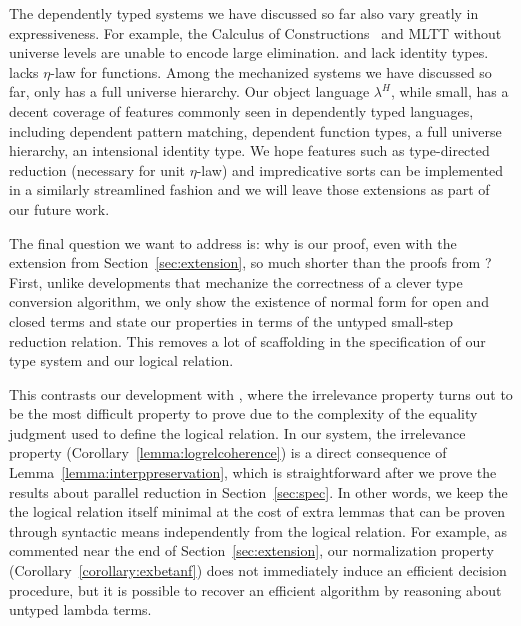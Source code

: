 \documentclass[acmsmall,screen=true,
\ifpublic review=false\else,review=true\fi
  ,anonymous=\ifanonymous true\else false\fi]{acmart}
\newcommand{\lang}{$\lambda^H$\xspace}
\newcommand{\scw}[1]{}
\begin{document}
The dependently typed systems we have discussed so far also vary
greatly in expressiveness. For example, the Calculus of
Constructions~\citep{CoC} and MLTT without universe levels are unable
to encode large elimination. \citet{decagda} and \citet{nbeincoq} lack
identity types. \citet{nbeincoq} lacks $\eta$-law for functions. Among
the mechanized systems we have discussed so far, only
\citet{anand2014towards} has a full universe hierarchy.
Our object language \lang{}, while small, has a decent coverage of
features commonly seen in dependently typed languages, including
dependent pattern matching, dependent function types, a full universe
hierarchy, an intensional identity type. We hope features such as
type-directed reduction (necessary for unit $\eta$-law) and
impredicative sorts can be implemented in a similarly streamlined
fashion and we will leave those extensions as part of our future work.

\scw{should this be a new subsection?}
The final question we want to address is: why is our proof,
even with the extension from Section~\ref{sec:extension}, so much
shorter than the proofs from \citet{decagda, nbeincoq,
  martin-lof-a-la-coq}?
First, unlike developments that mechanize the correctness of a clever
type conversion algorithm, we only show the existence of
normal form for open and closed terms and state our properties in
terms of the untyped small-step reduction relation. This removes a lot
of scaffolding in the specification of our type system and our logical
relation.

This contrasts our development with
\citet{martin-lof-a-la-coq}, where the irrelevance property turns out to be the most
difficult property to prove due to the complexity of the equality
judgment used to define the logical relation. In our system, the
irrelevance property (Corollary~\ref{lemma:logrelcoherence}) is a
direct consequence of Lemma~\ref{lemma:interppreservation},\scw{refer to
lemma name} which is
straightforward after we prove the results about parallel
reduction in Section~\ref{sec:spec}. In other words, we keep the
the logical relation itself minimal at the cost of extra lemmas that can be proven
through syntactic means independently from the logical relation.
For example, as commented near the end of Section~\ref{sec:extension},
our normalization property (Corollary~\ref{corollary:exbetanf})
does not immediately induce an efficient decision procedure, but it is
possible to recover an efficient algorithm by reasoning about untyped
lambda terms.
\end{document}
